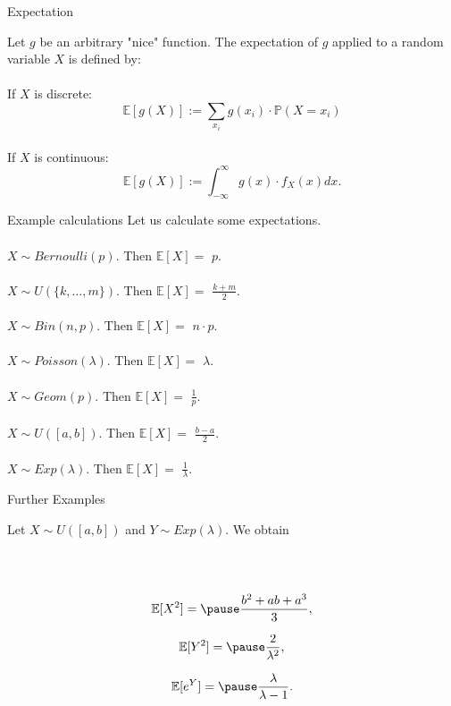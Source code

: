 \documentclass[11pt,pdf,ngerman,UKenglish]{beamer}%
\newcommand{\IP}{\mathbb{P}}
\newcommand{\IE}{{\mathbb{E}}}
\newcommand{\1}{\mathbb{1}}
\theoremstyle{thm}
\theoremstyle{def}
\begin{document}
\begin{frame}{Expectation}
\begin{block}{}
Let $g$ be an arbitrary "nice" function. The expectation of $g$ applied to a random variable $X$ is defined by:
\\ \ \\
If $X$ is discrete:
$$ \IE [ g(X) ] := \sum_{x_i} g(x_i) \cdot \IP( X = x_i)$$
\ \\
If $X$ is continuous:
$$ \IE [ g(X) ] := \int_{-\infty}^\infty g(x) \cdot f_X(x) dx.$$
\end{block}
\end{frame}


\begin{frame}{Example calculations}
Let us calculate some expectations.
\\ \ \\
$X \sim Bernoulli(p)$. Then $\IE[X] = $ \pause $p$.
\\ \ \\
$X \sim U(\{k, \ldots, m \})$. Then $\IE[X] = $ \pause $\frac{k+m}{2}$.
\\ \ \\
$X \sim Bin(n,p)$. Then $\IE[X] = $ \pause $n \cdot p$.
\\ \ \\
$X \sim Poisson(\lambda)$. Then $\IE[X] = $ \pause $\lambda$.
\\ \ \\
$X \sim Geom(p)$. Then $\IE[X] = $ \pause $\frac1p$.
\\ \ \\
$X \sim U([a,b])$. Then $\IE[X] = $ \pause $\frac{b-a}{2}$.
\\ \ \\
$X \sim Exp(\lambda)$. Then $\IE[X] = $ \pause $\frac1\lambda$.
\end{frame}


\begin{frame}{Further Examples}

Let $X \sim U([a,b])$ and $Y \sim Exp(\lambda)$. We obtain

\ \\ \ \\
$$\IE[X^2] = \pause \frac{b^2 + ab + a^3}{3},$$

$$\IE[Y^2] = \pause \frac{2}{\lambda^2},$$

$$\IE[e^Y] = \pause \frac{\lambda}{\lambda -1}.$$

\end{frame}


%
\end{document}
